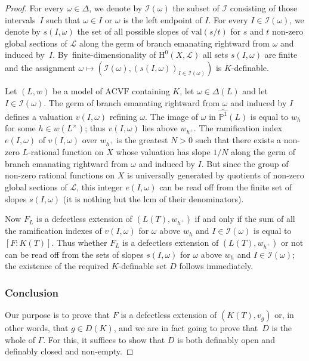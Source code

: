 \documentclass[JEP,XML,SOM,Unicode,ThmDefs,NoEqCountersInSection,published]{cedram}
\newcommand{\val}{\mathrm{val}}
\renewcommand{\H}{\mathrm H}
\newcommand{\acvf}{\mathrm{ACVF}}
\renewcommand{\P}{\mathbb P}
\theoremstyle{plain}
\theoremstyle{definition}
\begin{document}
\begin{proof}
For every $\omega\in \Delta$, we denote by $\mathscr I(\omega)$ the
subset of $\mathscr I$ consisting of those intervals~$I$ such that $\omega\in I$
or $\omega$ is the left endpoint of $I$.
For every $I\in \mathscr I(\omega)$, we denote by $s(I,\omega)$ the
set of all
possible slopes of $\val(s/t)$ for $s$ and $t$ non-zero global sections of
$\mathscr L$ along
the germ of branch emanating rightward from $\omega$
and induced by~$I$.
By~finite-dimensionality of
$\H^0(X,\mathscr L)$ all sets $s(I,\omega)$
are finite
and the assignment $\omega \mapsto (\mathscr I(\omega),
(s(I,\omega))_{I\in \mathscr I(\omega)})$ is $K$-definable.

Let $(L,w)$
be a model of $\acvf$ containing $K$,
let $\omega\in \Delta(L)$ and let $I\in \mathscr I(\omega)$.
The germ of branch emanating rightward from $\omega$
and induced by $I$ defines a valuation $v(I,\omega)$ refining
$\omega$. The image of $\omega$ in $\widehat{\P^1}(L)$
is equal to $w_h$ for some
$h\in w(L^\times)$; thus $v(I,\omega)$ lies above $w_{h^+}$.
The ramification index $e(I,\omega)$
of
$v(I,\omega)$ over $w_{h^+}$ is the greatest $N>0$ such that there exists a
non-zero $L$-rational function on $X$ whose valuation has slope $1/N$
along the germ of branch emanating rightward from $\omega$
and induced by $I$. But since the group of non-zero rational functions on
$X$ is universally generated by quotients of non-zero global sections of $\mathscr L$, this integer $e(I,\omega)$
can be read off from the finite set of slopes $s(I,\omega)$ (it is nothing but the lcm of their denominators).

Now $F_L$ is a defectless extension of $(L(T), w_{h^+})$ if and only if the sum
of all the ramification indexes of $v(I,\omega)$ for $\omega$ above $w_h$
and $I\in \mathscr I(\omega)$ is equal to $[F:K(T)]$.
Thus whether $F_L$ is a defectless extension of $(L(T),w_{h^+})$ or not
can be read off from the sets of slopes $s(I,\omega)$ for $\omega$
above $w_h$ and $I\in \mathscr I(\omega)$; the existence of the required
$K$-definable set $D$ follows immediately.

\subsubsection{Conclusion}

Our purpose is to prove that $F$ is a defectless extension of
$(K(T),v_g)$ or, in other words, that $g\in D(K)$, and we are in fact
going to prove that~$D$ is the whole of $\Gamma$. For this, it suffices to show
that $D$ is both definably open and definably closed and non-empty.


\end{proof}
\end{document}
